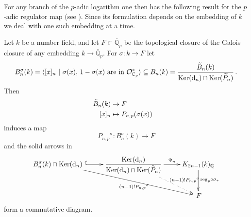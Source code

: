 \documentclass{amsart}
\begin{document}
For any branch of the {$p$-adic{\futurelet{}}} logarithm one then has the following result
for the {$p$-adic{\futurelet{}}} regulator map (see \cite[Theorem~1.10 or page 909]{BdJ03}).
Since its formulation depends on the embedding of $ k $ we deal with one such embedding at a time.

\begin{theorem}\label{synreg}
Let $ k $ be a number field, and let $ F \subset {{\overline {\mathbb Q}_p}} $ be the topological closure of the Galois
closure of any embedding $ k \to {{\overline {\mathbb Q}_p}} $.
For $ {\sigma} : k \to F $ let
$$
B_n^{\sigma}(k) = \langle  [x]_n\,\, |\text{ $ {\sigma}(x) $, $ 1-{\sigma}(x) $ are in $ {\mathcal O}_{{\mathbb C_p}}^* $}\rangle
\subseteq B_n(k) = \dfrac{{\widetilde B}_n(k)}{{\operatorname{Ker}}({{\textup{d}}}_n) \hskip-.5pt \cap {\operatorname{Ker}}(\widetilde P_n)}
\,.
$$
Then
\begin{alignat*}{1}
{\widetilde B}_n(k) & \to F \cr
[x]_n & \mapsto {P_{n,p}}({\sigma}(x))
\end{alignat*}
induces a map
$$
{P_{n,p}}^{\sigma} : B_n^{\sigma}(k) \to F
$$
and the solid arrows in
$$
\xymatrix{
B_n^{\sigma}(k) \cap {{\operatorname{Ker}}({{\textup{d}}}_n)} \,\, \ar@{^{(}->}[r]\ar[rrd]_-{(n-1)!{P_{n,p}}^{\sigma}}
&
\dfrac{{\operatorname{Ker}}({{\textup{d}}}_n)}{{\operatorname{Ker}}({{\textup{d}}}_n) \hskip-.5pt \cap {\operatorname{Ker}}(\widetilde P_n)} \ar[r]^-{\Psi_n}\ar@{.>}[rd]^-{\,\,(n-1)!{P_{n,p}}^{\sigma}}
&
{K_{2n-1}(k)_{\mathbb Q}}\ar[d]^-{{\textup{reg}}_p\circ{\sigma}_*}
\\
&
&
\,F
}
$$
form a commutative diagram.
\end{theorem}
\end{document}
